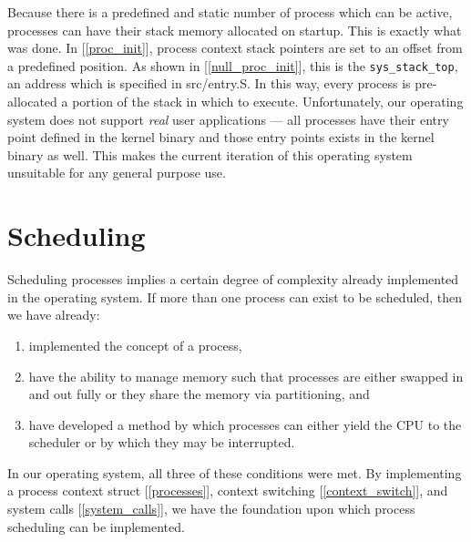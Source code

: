 \documentclass[12pt]{article}
\newcommand{\code}[1]{\colorbox{codegray}{\texttt{\footnotesize{#1}}}}
\begin{document}
Because there is a predefined and static number of process
which can be active, processes can have their stack memory
allocated on startup.  This is exactly what was done.
In [\ref{proc_init}], process context stack pointers are set to
an offset from a predefined position.  As shown in
	[\ref{null_proc_init}], this is the \code{sys\_stack\_top}, an
address which is specified in src/entry.S\@.  In this way,
every process is pre-allocated a portion of the stack in which
to execute.  Unfortunately, our operating system does not
support \textit{real} user applications --- all processes have
their entry point defined in the kernel binary and those entry
points exists in the kernel binary as well.  This makes the
current iteration of this operating system unsuitable for any
general purpose use.

\section{Scheduling}\label{scheduling}
Scheduling processes implies a certain degree of complexity already
implemented in the operating system.  If more than one process can
exist to be scheduled, then we have already:
\begin{enumerate}
	\item implemented the concept of a process,
	\item have the ability to manage memory such that processes are either
	      swapped in and out fully or they share the memory via partitioning,
	      and
	\item have developed a method by which processes can either yield the
	      CPU to the scheduler or by which they may be interrupted.
\end{enumerate}
In our operating system, all three of these conditions were met.
By implementing a process context struct [\ref{processes}], context
switching [\ref{context_switch}], and system calls
	[\ref{system_calls}],
we have the foundation upon which process scheduling can be
implemented.
\end{document}
